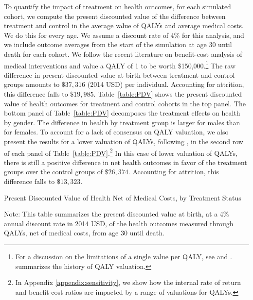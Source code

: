 \noindent To quantify the impact of treatment on health outcomes, for each simulated cohort, we compute the present discounted value of the difference between treatment and control in the average value of QALYs and average medical costs. We do this for every age. We assume a discount rate of 4\% for this analysis, and we include outcome averages from the start of the simulation at age 30 until death for each cohort. We follow the recent literature on benefit-cost analysis of medical interventions and value a QALY of 1 to be worth \$150,000.\footnote{For a discussion on the limitations of a single value per QALY, see \citet{Pinto-Prades_etal_2009_Trying-to-Estimate} and \citet{Mason_etal_2009_Modelling}. \citet{Grosse_2008_Assessing-Cost-Effectiveness} summarizes the history of QALY valuation.} The raw difference in present discounted value at birth between treatment and control groups amounts to $ \$37,316  $ (2014 USD) per individual. Accounting for attrition, this difference falls to $ \$19,985 $. Table~\ref{table:PDV} shows the present discounted value of health outcomes for treatment and control cohorts in the top panel. The bottom panel of Table~\ref{table:PDV} decomposes the treatment effects on health by gender. The difference in health by treatment group is larger for males than for females. To account for a lack of consensus on QALY valuation, we also present the results for a lower valuation of QALYs, following \citet{Cutler_Meara_1998_Med-Costs_BOOK}, in the second row of each panel of Table~\ref{table:PDV}.\footnote{In Appendix \ref{appendix:sensitivity}, we show how the internal rate of return and benefit-cost ratios are impacted by a range of valuations for QALYs.} In this case of lower valuation of QALYs, there is still a positive difference in net health outcomes in favor of the treatment groups over the control groups of $ \$26,374$. Accounting for attrition, this difference falls to $ \$13,323$. \\

\begin{table}[H]
\begin{threeparttable}
\small
\caption{Present Discounted Value of Health Net of Medical Costs, by Treatment Status} \label{table:PDV}

\begin{tablenotes}
\footnotesize
\item Note: This table summarizes the present discounted value at birth, at a 4\% annual discount rate in 2014 USD, of the health outcomes measured through QALYs, net of medical costs, from age 30 until death. \\
\end{tablenotes}
\end{threeparttable}
\end{table}
